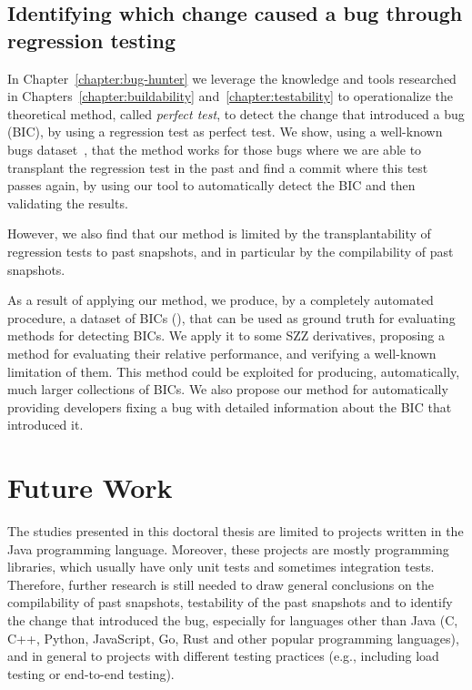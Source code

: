 
\subsection{Identifying which change caused a bug through regression testing}

In Chapter~\ref{chapter:bug-hunter} we leverage the knowledge and tools researched in Chapters~\ref{chapter:buildability} and~\ref{chapter:testability} to operationalize the theoretical method, called \emph{perfect test}, to detect the change that introduced a bug (BIC), by using a regression test as perfect test. We show, using a well-known bugs dataset~\cite{just2014defects4j}, that the method works for those bugs where we are able to transplant the regression test in the past and find a commit where this test passes again, by using our tool to automatically detect the BIC and then validating the results. 

However, we also find that our method is limited by the transplantability of regression tests to past snapshots, and in particular by the compilability of past snapshots.

As a result of applying our method, we produce, by a completely automated procedure, a dataset of BICs (\datasetName), that can be used as ground truth for evaluating methods for detecting BICs. 
We apply it to some SZZ derivatives, proposing a method for evaluating their relative performance, and verifying a well-known limitation of them. 
This method could be exploited for producing, automatically, much larger collections of BICs. 
We also propose our method for automatically providing developers fixing a bug with detailed information about the BIC that introduced it.

\section{Future Work}
\label{sec:future-work}

The studies presented in this doctoral thesis are limited to projects written in the Java programming language. Moreover, these projects are mostly programming libraries, which usually have only unit tests and sometimes integration tests.
Therefore, further research is still needed to draw general conclusions on the compilability of past snapshots, testability of the past snapshots and to identify the change that introduced the bug, especially for languages other than Java (C, C++, Python, JavaScript, Go, Rust and other popular programming languages), and in general to projects with different testing practices (e.g., including load testing or end-to-end testing).

